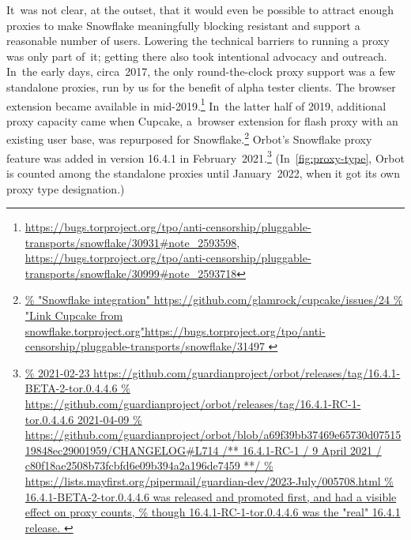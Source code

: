 \documentclass[letterpaper,twocolumn]{article}
\newlength{\urlfootnotesize}
\newcommand{\urlfootnote}[1]{\footnote{
\raggedright\fontsize{\urlfootnotesize}{\urlfootnotesize}\selectfont\url{#1}
}}
\begin{document}
It~was not clear, at the outset,
that it would even be possible to attract
enough proxies to make Snowflake meaningfully blocking resistant
and support a reasonable number of users.
Lowering the technical barriers to running a proxy was only part of~it;
getting there also took intentional advocacy and outreach.
In~the early days, circa~2017,
the only round-the-clock proxy support was
a few standalone proxies,
run by us for the benefit of alpha tester clients.
The browser extension became available in mid-2019.\footnote{
\raggedright\fontsize{\urlfootnotesize}{\urlfootnotesize}\selectfont%
\url{https://bugs.torproject.org/tpo/anti-censorship/pluggable-transports/snowflake/30931\#note_2593598},
\url{https://bugs.torproject.org/tpo/anti-censorship/pluggable-transports/snowflake/30999\#note_2593718}
}
In~the latter half of 2019,
additional proxy capacity came when Cupcake,
a~browser extension for flash proxy with an existing user base,
was repurposed for Snowflake.\urlfootnote{
https://github.com/glamrock/cupcake/issues/24
}
Orbot's Snowflake proxy feature was added in version 16.4.1 in February~2021.\urlfootnote{
https://github.com/guardianproject/orbot/releases/tag/16.4.1-BETA-2-tor.0.4.4.6
}
(In~\autoref{fig:proxy-type}, Orbot is counted among the standalone proxies
until January~2022, when it got its own proxy type designation.)
\end{document}
